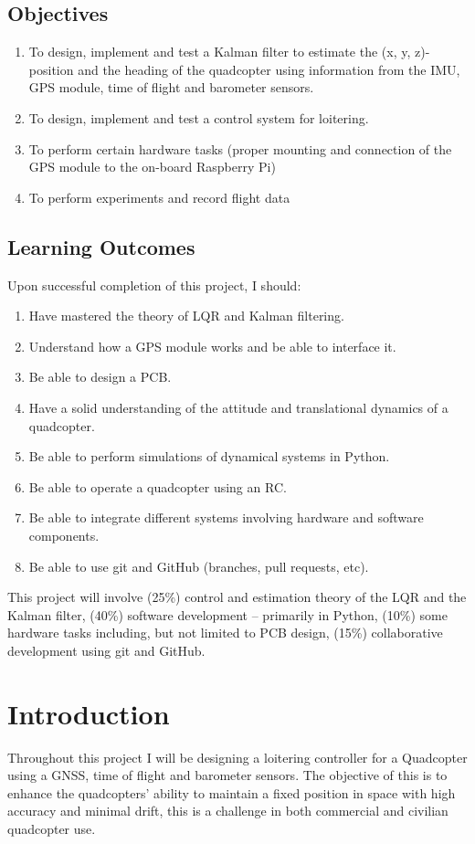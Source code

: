 \documentclass{article}
\begin{document}
\subsection*{Objectives}
\begin{enumerate}
    \item To design, implement and test a Kalman filter to estimate the (x, y, z)-	position and the heading of the quadcopter using information from the IMU, GPS module, time of flight and barometer sensors.
    \item To design, implement and test a control system for loitering.
    \item To perform certain hardware tasks (proper mounting and connection of the GPS module to the on-board
    Raspberry Pi)
    \item To perform experiments and record flight data
\end{enumerate}

\subsection*{Learning Outcomes}
Upon successful completion of this project, I should:
\begin{enumerate}
    \item Have mastered the theory of LQR and Kalman filtering.
    \item Understand how a GPS module works and be able to interface it.
    \item Be able to design a PCB.
    \item Have a solid understanding of the attitude and translational dynamics of a quadcopter.
    \item Be able to perform simulations of dynamical systems in Python.
    \item Be able to operate a quadcopter using an RC.
    \item Be able to integrate different systems involving hardware and software components.
    \item Be able to use git and GitHub (branches, pull requests, etc).
\end{enumerate}
This project will involve (25\%) control and estimation theory of the LQR and the Kalman filter,
(40\%) software development – primarily in Python, (10\%) some hardware tasks including, but
not limited to PCB design, (15\%) collaborative development using git and GitHub.

\newpage
\tableofcontents
\newpage

\section{Introduction}
Throughout this project I will be designing a loitering controller for a Quadcopter using a GNSS, time of flight and barometer sensors. 
The objective of this is to enhance the quadcopters’ ability to maintain a fixed position in space with high accuracy 
and minimal drift, this is a challenge in both commercial and civilian quadcopter use.
\end{document}
